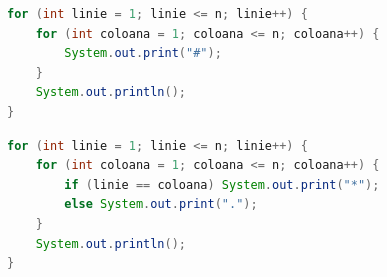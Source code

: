 \begin{examplebox}
\begin{lstlisting}[style=languagequest,language=Java]
for (int linie = 1; linie <= n; linie++) {
    for (int coloana = 1; coloana <= n; coloana++) {
        System.out.print("#");
    }
    System.out.println();
}
\end{lstlisting}
\end{examplebox}

\begin{examplebox}
\begin{lstlisting}[style=languagequest,language=Java]
for (int linie = 1; linie <= n; linie++) {
    for (int coloana = 1; coloana <= n; coloana++) {
        if (linie == coloana) System.out.print("*");
        else System.out.print(".");
    }
    System.out.println();
}
\end{lstlisting}
\end{examplebox}

\clearpage
